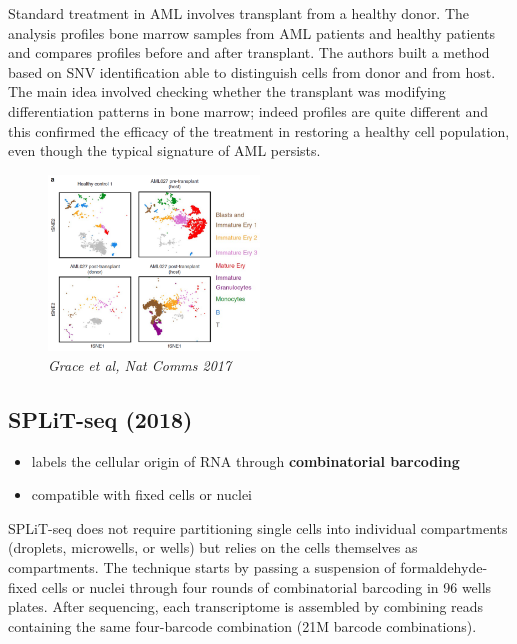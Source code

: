Standard treatment in AML involves transplant from a healthy donor. The
analysis profiles bone marrow samples from AML patients and healthy
patients and compares profiles before and after transplant. The authors
built a method based on SNV identification able to distinguish cells
from donor and from host. The main idea involved checking whether the
transplant was modifying differentiation patterns in bone marrow; indeed
profiles are quite different and this confirmed the efficacy of the
treatment in restoring a healthy cell population, even though the
typical signature of AML persists.

\begin{figure}
\centering
\includegraphics[width=0.5\textwidth]{images/Screenshot_2023-03-24_at_08-16-37.png}
\caption{\emph{Grace et al, Nat Comms 2017}}
\end{figure}

\hypertarget{split-seq-2018}{%
\subsection{SPLiT-seq (2018)}\label{split-seq-2018}}

\begin{itemize}
\tightlist
\item
  labels the cellular origin of RNA through \textbf{combinatorial
  barcoding}
\item
  compatible with fixed cells or nuclei
\end{itemize}

SPLiT-seq does not require partitioning single cells into individual
compartments (droplets, microwells, or wells) but relies on the cells
themselves as compartments.  The technique starts by passing a suspension of formaldehyde-fixed
cells or nuclei through four rounds of combinatorial barcoding in 96
wells plates. After sequencing, each transcriptome is assembled by
combining reads containing the same four-barcode combination (21M
barcode combinations).

